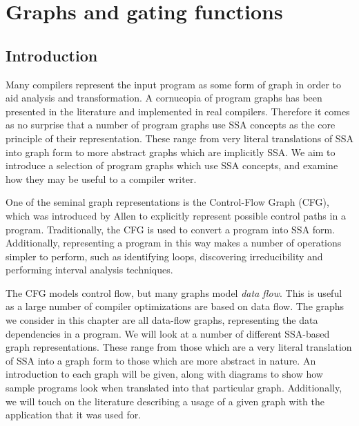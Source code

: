 \chapter{Graphs and gating functions }
\label{chapter:vsdg}


\newcommand{\Gn}{$\gamma$-node}
\newcommand{\Gns}{$\gamma$-nodes}
\newcommand{\Tn}{$\theta$-node}
\newcommand{\Tns}{$\theta$-nodes}
\newcommand{\Ttns}{$\theta^{\mathit{tail}}$-nodes}
\newcommand{\triVM}{\textit{tri}VM}

\newcommand{\instruction}[1]{\texttt{#1}}
\newcommand{\register}[1]{\texttt{v#1}}

\section{Introduction}
Many compilers represent the input program as some form of graph in order to aid analysis and transformation. 
A cornucopia of program graphs has been presented in the literature and implemented in real compilers. 
Therefore it comes as no surprise that a number of program graphs use SSA concepts as the core principle of their representation. 
These range from very literal translations of SSA into graph form to more abstract graphs which are implicitly SSA. 
We aim to introduce a selection of program graphs which use SSA concepts, and examine how they may be useful to a compiler writer.

One of the seminal graph representations is the Control-Flow Graph (CFG), which was introduced by Allen to explicitly represent possible control paths in a program. 
Traditionally, the CFG is used to convert a program into SSA form. 
Additionally, representing a program in this way makes a number of operations simpler to perform, such as identifying loops, discovering irreducibility and performing interval analysis techniques.

The CFG models control flow, but many graphs model \textit{data flow}. 
This is useful as a large number of compiler optimizations are based on data flow. 
The graphs we consider in this chapter are all data-flow graphs, representing the data dependencies in a program. 
We will look at a number of different SSA-based graph representations. 
These range from those which are a very literal translation of SSA into a graph form to those which are more abstract in nature. 
An introduction to each graph will be given, along with diagrams to show how sample programs look when translated into that particular graph. 
Additionally, we will touch on the literature describing a usage of a given graph with the application that it was used for.

